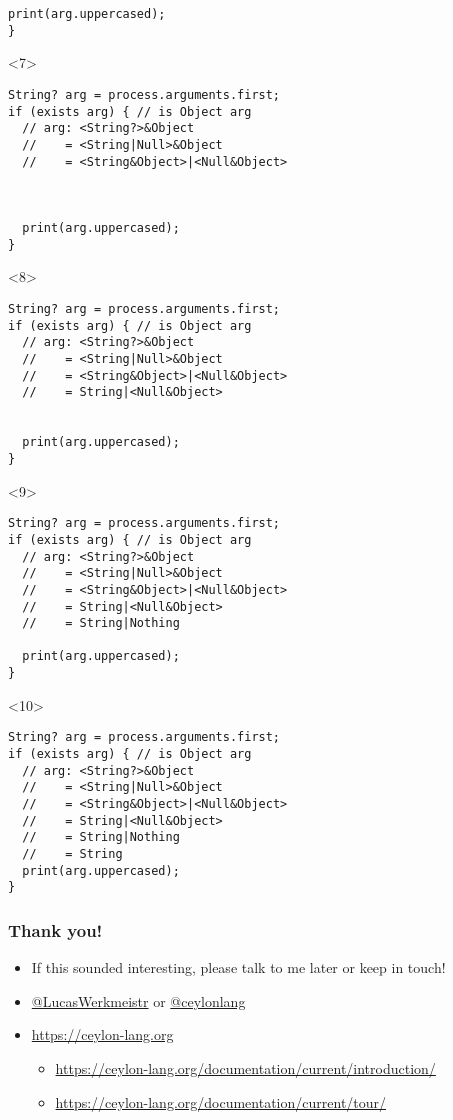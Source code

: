 \documentclass[aspectratio=169]{beamer}
\makeatletter
\newcommand{\TwitterUsername}[1]{\href{https://twitter.com/#1}{\ttfamily @#1}}
\makeatother
\begin{document}
\begin{frame}[fragile]
\begin{onlyenv}
\begin{lstlisting}[escapechar=!]
  print(arg.uppercased);
}
    \end{lstlisting}
  \end{onlyenv}
  \begin{onlyenv}<7>
    \begin{lstlisting}
String? arg = process.arguments.first;
if (exists arg) { // is Object arg
  // arg: <String?>&Object
  //    = <String|Null>&Object
  //    = <String&Object>|<Null&Object>



  print(arg.uppercased);
}
    \end{lstlisting}
  \end{onlyenv}
  \begin{onlyenv}<8>
    \begin{lstlisting}
String? arg = process.arguments.first;
if (exists arg) { // is Object arg
  // arg: <String?>&Object
  //    = <String|Null>&Object
  //    = <String&Object>|<Null&Object>
  //    = String|<Null&Object>


  print(arg.uppercased);
}
    \end{lstlisting}
  \end{onlyenv}
  \begin{onlyenv}<9>
    \begin{lstlisting}
String? arg = process.arguments.first;
if (exists arg) { // is Object arg
  // arg: <String?>&Object
  //    = <String|Null>&Object
  //    = <String&Object>|<Null&Object>
  //    = String|<Null&Object>
  //    = String|Nothing

  print(arg.uppercased);
}
    \end{lstlisting}
  \end{onlyenv}
  \begin{onlyenv}<10>
    \begin{lstlisting}
String? arg = process.arguments.first;
if (exists arg) { // is Object arg
  // arg: <String?>&Object
  //    = <String|Null>&Object
  //    = <String&Object>|<Null&Object>
  //    = String|<Null&Object>
  //    = String|Nothing
  //    = String
  print(arg.uppercased);
}
    \end{lstlisting}
  \end{onlyenv}
\end{frame}

\begin{frame}
  \frametitle{Thank you!}
  \begin{itemize}
  \item If this sounded interesting, please talk to me later or keep in touch!
  \item \TwitterUsername{LucasWerkmeistr} or \TwitterUsername{ceylonlang}
  \item \url{https://ceylon-lang.org}
    \begin{itemize}
    \item \url{https://ceylon-lang.org/documentation/current/introduction/}
    \item \url{https://ceylon-lang.org/documentation/current/tour/}
    \end{itemize}
  \end{itemize}
\end{frame}
\end{document}
